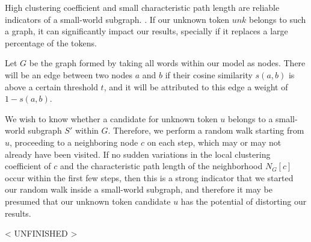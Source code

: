 \documentclass[11pt,a4paper]{article}
\newcommand{\1}{\boldsymbol{1}}
\begin{document}
High clustering coefficient and small characteristic path length are reliable indicators of a small-world subgraph. \cite[p.35]{Cecchini2017GraphbasedCA}. If our unknown token $unk$ belongs to such a graph, it can significantly impact our results, specially if it replaces a large percentage of the tokens.

Let $G$ be the graph formed by taking all words within our model as nodes. There will be an edge between two nodes $a$ and $b$ if their cosine similarity $s(a,b)$ is above a certain threshold $t$, and it will be attributed to this edge a weight of $1 - s(a,b)$.

We wish to know whether a candidate for unknown token $u$ belongs to a small-world subgraph $S'$ within $G$. Therefore, we perform a random walk starting from $u$, proceeding to a neighboring node $c$ on each step, which may or may not already have been visited. If no sudden variations in the local clustering coefficient of $c$ and the characteristic path length of the neighborhood $N_{G}[c]$ occur within the first few steps, then this is a strong indicator that we started our random walk inside a small-world subgraph, and therefore it may be presumed that our unknown token candidate $u$ has the potential of distorting our results.


< UNFINISHED >

\end{document}
